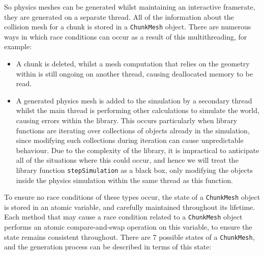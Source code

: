 \documentclass[11pt]{article}
\begin{document}
So physics meshes can be generated whilst maintaining an interactive framerate, they are generated on a separate thread. All of the information about the collision mesh for a chunk is stored in a \texttt{ChunkMesh} object. There are numerous ways in which race conditions can occur as a result of this multithreading, for example:
\begin{itemize}
  \item A chunk is deleted, whilst a mesh computation that relies on the geometry within is still ongoing on another thread, causing deallocated memory to be read.
  \item A generated physics mesh is added to the simulation by a secondary thread whilst the main thread is performing other calculations to simulate the world, causing errors within the library. This occurs particularly when library functions are iterating over collections of objects already in the simulation, since modifying such collections during iteration can cause unpredictable behaviour. Due to the complexity of the library, it is impractical to anticipate all of the situations where this could occur, and hence we will treat the library function \texttt{stepSimulation} as a black box, only modifying the objects inside the physics simulation within the same thread as this function.
\end{itemize}
To ensure no race conditions of these types occur, the state of a \texttt{ChunkMesh} object is stored in an atomic variable, and carefully maintained throughout its lifetime. Each method that may cause a race condition related to a \texttt{ChunkMesh} object performs an atomic compare-and-swap operation on this variable, to ensure the state remains consistent throughout. There are 7 possible states of a \texttt{ChunkMesh}, and the generation process can be described in terms of this state:
\end{document}
